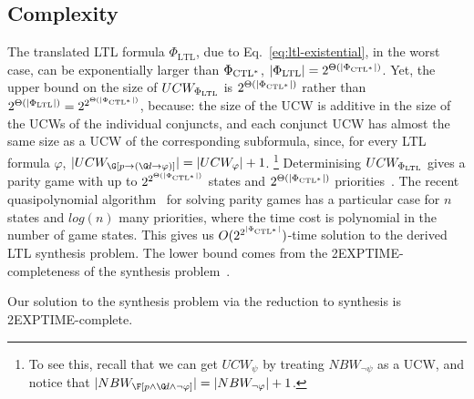 \subsection{Complexity}
The translated LTL formula $\Phi_\text{LTL}$, due to Eq.~\ref{eq:ltl-existential},
in the worst case, can be exponentially larger than $\Phi_{\text{CTL}^*}$,
$|\Phi_\text{LTL}| = 2^{\Theta(|\Phi_{\text{CTL}^*}|)}$.
Yet, the upper bound on the size of $UCW_{\Phi_\text{LTL}}$ is $2^{\Theta(|\Phi_{\text{CTL}^*}|)}$
rather than $2^{\Theta(|\Phi_\text{LTL}|)}=2^{2^{\Theta(|\Phi_{\text{CTL}^*}|)}}$,
because:
\li
\- the size of the UCW is additive in the size of the UCWs of the individual conjuncts, and
\- each conjunct UCW has almost the same size as a UCW of the corresponding subformula,
   since, for every LTL formula $\varphi$, $|UCW_{\G[p \impl (\G\!d \impl \varphi)]}| = |UCW_\varphi|+1$.%
   \footnote{To see this, recall that we can get $UCW_\psi$ by
     treating $NBW_{\neg\psi}$ as a UCW,
     and notice that $|NBW_{\F[p\land\G\!d\land\neg\varphi]}| = |NBW_{\neg\varphi}|+1$.}
\il
Determinising $UCW_{\Phi_\text{LTL}}$ gives a parity game with up to $2^{2^{\Theta(|\Phi_{\text{CTL}^*}|)}}$ states and
$2^{\Theta(|\Phi_{\text{CTL}^*}|)}$ priorities~\cite{Schewe/09/determinise,Piterman07,Safra}.
The recent quasipolynomial algorithm~\cite{DBLP:conf/stoc/CaludeJKL017} for solving parity games
has a particular case for $n$ states and $log(n)$ many priorities,
where the time cost is polynomial in the number of game states.
This gives us $O(2^{2^{|\Phi_{\text{CTL}^*}|}})$-time solution to the derived LTL synthesis problem.
The lower bound comes from the 2EXPTIME-completeness of the \CTLstar synthesis problem~\cite{RosnerThesis}.


\begin{theorem}
  Our solution to the \CTLstar synthesis problem
  via the reduction to \LTL synthesis
  is 2EXPTIME-complete.
\end{theorem}

